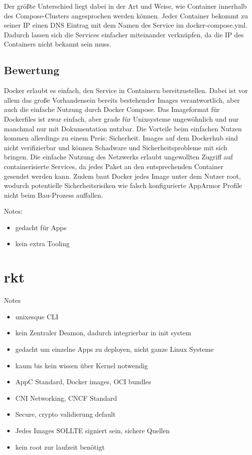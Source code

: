 Der größte Unterschied liegt dabei in der Art und Weise, wie Container innerhalb des Compose-Clusters angesprochen werden können. Jeder Container bekommt zu seiner IP einen DNS Eintrag mit dem Namen des Service im docker-compose.yml. Dadurch lassen sich die Services einfacher miteinander verknüpfen, da die IP des Containers nicht bekannt sein muss.

\subsection{Bewertung}
\label{sec:compDockerBewertung}
Docker erlaubt es einfach, den Service in Containern bereitzustellen. Dabei ist vor allem das große Vorhandensein bereits bestehender Images verantwortlich, aber auch die einfache Nutzung durch Docker Compose. Das Imageformat für Dockerfiles ist zwar einfach, aber grade für Unixsysteme ungewöhnlich und nur manchmal nur mit Dokumentation nutzbar. Die Vorteile beim einfachen Nutzen kommen allerdings zu einem Preis: Sicherheit. Images auf dem Dockerhub sind nicht verifizierbar und können Schadware und Sicherheitsprobleme mit sich bringen. Die einfache Nutzung des Netzwerks erlaubt ungewollten Zugriff auf containerisierte Services, da jedes Paket an den entsprechenden Container gesendet werden kann. Zudem baut Docker jedes Image unter dem Nutzer root, wodurch potentielle Sicherheitsrisiken wie falsch konfigurierte AppArmor Profile nicht beim Bau-Prozess auffallen.

Notes:
\begin{itemize}
	\item gedacht für Apps
	\item kein extra Tooling
\end{itemize}

\section{rkt}
\label{sec:compRkt}
Notes
\begin{itemize}
	\item unixesque CLI
	\item kein Zentraler Deamon, dadurch integrierbar in init system
	\item gedacht um einzelne Apps zu deployen, nicht ganze Linux Systeme
	\item kaum bis kein wissen über Kernel notwendig
	\item AppC Standard, Docker images, OCI bundles
	\item CNI Networking, CNCF Standard
	\item Secure, crypto validierung default
	\item Jedes Images SOLLTE signiert sein, sichere Quellen
	\item kein root zur laufzeit benötigt
\end{itemize}

